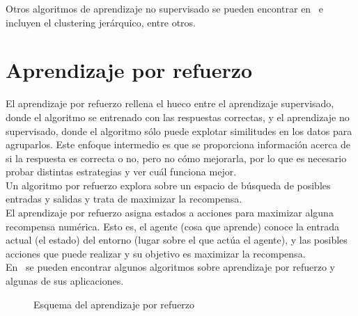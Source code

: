 Otros algoritmos de aprendizaje no supervisado se pueden encontrar en~\cite{hinton1999unsupervised} e incluyen el clustering jerárquico, entre otros.

\section{Aprendizaje por refuerzo}
El aprendizaje por refuerzo rellena el hueco entre el aprendizaje supervisado, donde el algoritmo se entrenado con las respuestas correctas, y el aprendizaje no supervisado, donde el algoritmo sólo puede explotar similitudes en los datos para agruparlos. Este enfoque intermedio es que se proporciona información acerca de si la respuesta es correcta o no, pero no cómo mejorarla, por lo que es necesario probar distintas estrategias y ver cuál funciona mejor.\\

Un algoritmo por refuerzo explora sobre un espacio de búsqueda de posibles entradas y salidas y trata de maximizar la recompensa.\\

El aprendizaje por refuerzo asigna estados a acciones para maximizar alguna recompensa numérica. Esto es, el agente (cosa que aprende) conoce la entrada actual (el estado) del entorno (lugar sobre el que actúa el agente), y las posibles acciones que puede realizar y su objetivo es maximizar la recompensa.\\

En~\cite{Sutton:1998:IRL:551283, Marsland:2009:MLA:1571643} se pueden encontrar algunos algoritmos sobre aprendizaje por refuerzo y algunas de sus aplicaciones.\\


\begin{figure}[htbp!]
	\label{fig:aprendizajerefuerzo}
	\begin{center}
		\resizebox{7cm}{!}{%
			\aprendizajerefuerzo
		}
	\end{center}
	\caption{Esquema del aprendizaje por refuerzo}
\end{figure}
